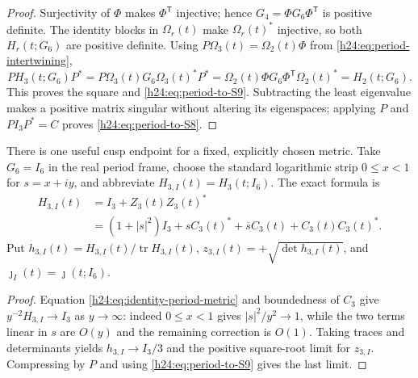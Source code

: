 \begin{proof}
Surjectivity of $\Phi$ makes $\Phi^{\mathsf T}$ injective; hence
$G_4=\Phi G_6\Phi^{\mathsf T}$ is positive definite.  The identity blocks
in $\Omega_r(t)$ make $\Omega_r(t)^*$ injective, so both $H_r(t;G_6)$ are
positive definite.  Using $P\Omega_3(t)=\Omega_2(t)\Phi$ from
\eqref{h24:eq:period-intertwining},
\[
 PH_3(t;G_6)P^*=P\Omega_3(t)G_6\Omega_3(t)^*P^*
 =\Omega_2(t)\Phi G_6\Phi^{\mathsf T}\Omega_2(t)^*=H_2(t;G_6).
\]
This proves the square and \eqref{h24:eq:period-to-S9}.  Subtracting the least
eigenvalue makes a positive matrix singular without altering its
eigenspaces; applying $P$ and $PI_3P^*=C$ proves
\eqref{h24:eq:period-to-S8}.
\end{proof}

There is one useful cusp endpoint for a fixed, explicitly chosen metric.
Take $G_6=I_6$ in the real period frame, choose the standard logarithmic
strip $0\le x<1$ for $s=x+iy$, and abbreviate
$H_{3,I}(t)=H_3(t;I_6)$.  The exact formula is
\begin{equation}
 \begin{split}
 H_{3,I}(t)
 &=I_3+Z_3(t)Z_3(t)^*\\
 &=(1+|s|^2)I_3+sC_3(t)^*+\overline{s}C_3(t)
   +C_3(t)C_3(t)^*.
 \end{split}
 \label{h24:eq:identity-period-metric}
\end{equation}
Put
$h_{3,I}(t)=H_{3,I}(t)/\operatorname{tr} H_{3,I}(t)$,
$z_{3,I}(t)=+\sqrt{\det h_{3,I}(t)}$, and
$\jmath_I(t)=\jmath(t;I_6)$.


\begin{proof}
Equation \eqref{h24:eq:identity-period-metric} and boundedness of $C_3$ give
$y^{-2}H_{3,I}\to I_3$ as $y\to\infty$: indeed $0\le x<1$ gives
$|s|^2/y^2\to1$, while the two terms linear in $s$ are $O(y)$ and the
remaining correction is $O(1)$.  Taking traces and determinants yields
$h_{3,I}\to I_3/3$ and the positive square-root limit for $z_{3,I}$.
Compressing by $P$ and using \eqref{h24:eq:period-to-S9} gives the last limit.
\end{proof}


